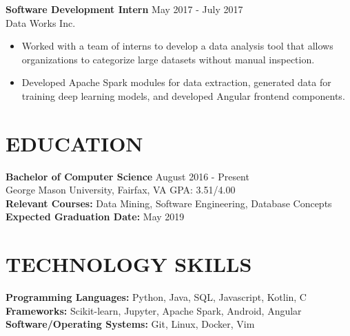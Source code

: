 \documentclass[11pt]{res} %
\begin{document}
\begin{resume}
\vspace{-8pt}\textbf{Software Development Intern} \hfill May 2017 - July 2017 \\
Data Works Inc.\smallskip
\begin{itemize}
\item Worked with a team of interns to develop a data analysis tool that allows organizations to categorize large datasets without manual inspection.
\item Developed Apache Spark modules for data extraction, generated data for training deep learning models, and developed Angular frontend components.
\end{itemize}

\vspace{-15pt}
\noindent\makebox[\linewidth]{\rule{\textwidth}{1pt}}


\vspace{-10pt}\section{EDUCATION} \smallskip

\textbf{Bachelor of Computer Science}  \hfill August 2016 - Present\\
\medskip
George Mason University, Fairfax, VA \hfill GPA: 3.51/4.00\\
\textbf{Relevant Courses:} Data Mining, Software Engineering, Database Concepts\\
\textbf{Expected Graduation Date:} May 2019

\vspace{-15pt}
\noindent\makebox[\linewidth]{\rule{\textwidth}{1pt}}


\vspace{-10pt}\section{TECHNOLOGY SKILLS} \smallskip

\textbf{Programming Languages:} Python, Java, SQL, Javascript, Kotlin, C \smallskip\\
\textbf{Frameworks:} Scikit-learn, Jupyter, Apache Spark, Android, Angular \smallskip\\
\textbf{Software/Operating Systems:} Git, Linux, Docker, Vim


\end{resume}
\end{document}
